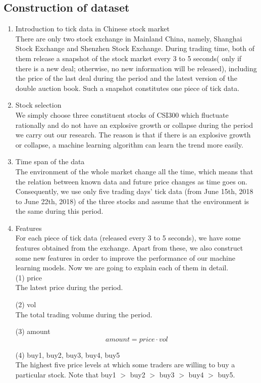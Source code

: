 \documentclass[10pt, conference, compsocconf]{IEEEtran}
\begin{document}
\subsection{Construction of dataset}
\begin{enumerate}
	\item Introduction to tick data in Chinese stock market\\
	There are only two stock exchange in Mainland China, namely, Shanghai Stock Exchange and Shenzhen Stock Exchange. During trading time, both of them release a snapshot of the stock market every 3 to 5 seconds( only if there is a new
	 deal; otherwise, no new information will be released), including the price of the last deal during the period and the latest version of the double auction book. Such a snapshot constitutes one piece of tick data. 
	\item Stock selection\\
	We simply choose three constituent stocks of CSI300 which fluctuate rationally and do not have an explosive growth or collapse during the period we carry out our research. The  reason is that if there is an explosive growth or collapse, 
	a machine learning algorithm can learn the trend more easily.
	\item Time span of the data\\
	The environment of the whole market change all the time, which means that the relation between known data and future price changes as time goes on. Consequently, we use only five trading days’ tick data (from June 15th, 2018 to June
	22th, 2018) of the three stocks and assume that the environment is the same during this period.
	\item Features\\
	For each piece of tick data (released every 3 to 5 seconds), we have some features obtained from the exchange. Apart from these, we also construct some new features in order to improve the performance of our machine learning models. 
	Now we are going to explain each of them in detail.\\
	(1) price\\
	The latest price during the period.

	(2) vol\\
	The total trading volume during the period.

	(3) amount\\
	$$
		amount = price \cdot vol 
	$$

	(4) buy1, buy2, buy3, buy4, buy5\\
	The highest five price levels at which some traders are willing to buy a particular stock. Note that buy1 $>$ buy2 $>$ buy3 $>$ buy4 $>$ buy5. 


\end{enumerate}
\end{document}
